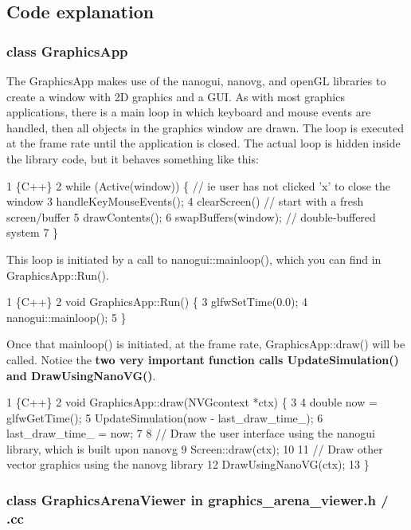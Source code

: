 \subsection*{Code explanation}

\subsubsection*{class Graphics\+App}

The Graphics\+App makes use of the nanogui, nanovg, and open\+GL libraries to create a window with 2D graphics and a G\+UI. As with most graphics applications, there is a main loop in which keyboard and mouse events are handled, then all objects in the graphics window are drawn. The loop is executed at the frame rate until the application is closed. The actual loop is hidden inside the library code, but it behaves something like this\+:


\begin{DoxyCode}
1 \{C++\}
2 while (Active(window)) \{  // ie user has not clicked 'x' to close the window
3   handleKeyMouseEvents();
4   clearScreen()   // start with a fresh screen/buffer
5   drawContents();
6   swapBuffers(window);    // double-buffered system
7 \}
\end{DoxyCode}


This loop is initiated by a call to nanogui\+::mainloop(), which you can find in Graphics\+App\+::\+Run().


\begin{DoxyCode}
1 \{C++\}
2 void GraphicsApp::Run() \{
3   glfwSetTime(0.0);
4   nanogui::mainloop();
5 \}
\end{DoxyCode}


Once that mainloop() is initiated, at the frame rate, Graphics\+App\+::draw() will be called. Notice the {\bfseries two very important function calls {\ttfamily Update\+Simulation()} and {\ttfamily Draw\+Using\+Nano\+V\+G()}}.


\begin{DoxyCode}
1 \{C++\}
2 void GraphicsApp::draw(NVGcontext *ctx) \{
3 
4   double now = glfwGetTime();
5   UpdateSimulation(now - last\_draw\_time\_);
6   last\_draw\_time\_ = now;
7 
8   // Draw the user interface using the nanogui library, which is built upon nanovg
9   Screen::draw(ctx);
10 
11   // Draw other vector graphics using the nanovg library
12   DrawUsingNanoVG(ctx);
13 \}
\end{DoxyCode}


\subsubsection*{class Graphics\+Arena\+Viewer in graphics\+\_\+arena\+\_\+viewer.\+h / .cc}

